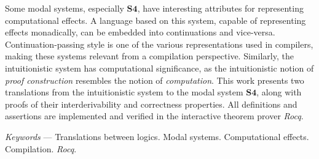 \begin{titlepage}
{}

Some modal systems, especially $\mathbf{S4}$, have interesting attributes for representing computational effects.
A language based on this system, capable of representing effects monadically, can be embedded into continuations and vice-versa.
Continuation-passing style is one of the various representations used in compilers, making these systems relevant from a compilation perspective.
Similarly, the intuitionistic system has computational significance, as the intuitionistic notion of \emph{proof construction} resembles the notion of \emph{computation}.
This work presents two translations from the intuitionistic system to the modal system $\mathbf{S4}$, along with proofs of their interderivability and correctness properties.
All definitions and assertions are implemented and verified in the interactive theorem prover \emph{Rocq}.

\vspace{.5\baselineskip}
\textit{Keywords} --- Translations between logics. Modal systems. Computational effects. Compilation. \emph{Rocq}.
\end{titlepage}